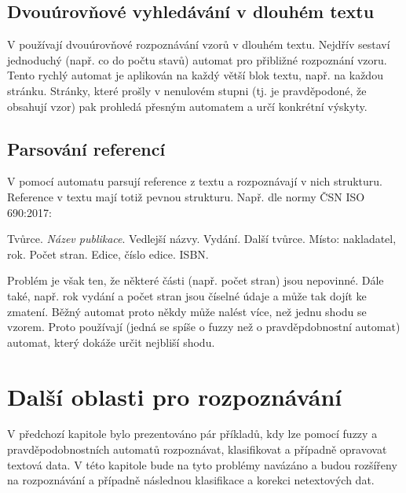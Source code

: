 \documentclass[a4paper,10pt]{article}
\begin{document}
\subsection{Dvouúrovňové vyhledávání v dlouhém textu}

V \cite{Hun-NoLiTexSeaUsFuFiStLiNoDetAut} používají dvouúrovňové rozpoznávání vzorů v dlouhém textu. Nejdřív sestaví jednoduchý (např. co do počtu stavů) automat pro přibližné rozpoznání vzoru. Tento rychlý automat je aplikován na každý větší blok textu, např. na každou stránku. Stránky, které prošly v nenulovém stupni (tj. je pravděpodoné, že obsahují vzor) pak prohledá přesným automatem a určí konkrétní výskyty.


\subsection{Parsování referencí}
V \cite{Kra+-BibMeExUsiPrFiStTra} pomocí automatu parsují reference z textu a rozpoznávají v nich strukturu. Reference v textu mají totiž pevnou strukturu. Např. dle normy ČSN ISO 690:2017:

Tvůrce. \textit{Název publikace}. Vedlejší názvy. Vydání. Další tvůrce. Místo: nakladatel, rok. Počet stran. Edice, číslo edice. ISBN.

Problém je však ten, že některé části (např. počet stran) jsou nepovinné. Dále také, např. rok vydání a počet stran jsou číselné údaje a může tak dojít ke zmatení. Běžný automat proto někdy může nalést více, než jednu shodu se vzorem. Proto používají  (jedná se spíše o fuzzy než o pravděpdobnostní automat) automat, který dokáže určit nejbliší shodu.


\section{Další oblasti pro rozpoznávání}
V předchozí kapitole bylo prezentováno pár příkladů, kdy lze pomocí fuzzy a pravděpodobnostních automatů rozpoznávat, klasifikovat a případně opravovat textová data. V této kapitole bude na tyto problémy navázáno a budou rozšířeny na rozpoznávání a případně následnou klasifikace a korekci netextových dat.
\end{document}
